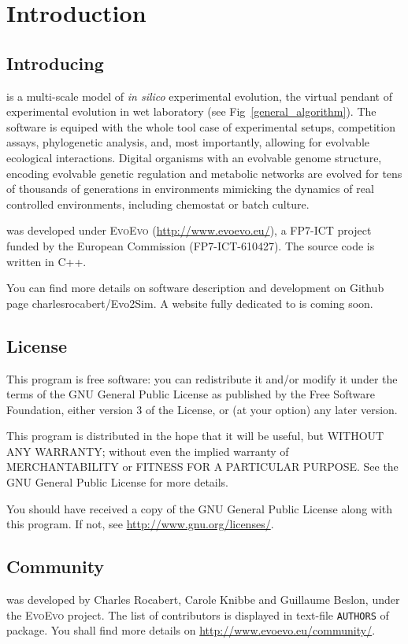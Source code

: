 \chapter{Introduction}

\section{Introducing \packageName}

{\packageName} is a multi-scale model of \textit{in silico} experimental evolution, the virtual pendant of experimental evolution in wet laboratory (see Fig~\ref{general_algorithm}).
The software is equiped with the whole tool case of experimental setups, competition assays, phylogenetic analysis, and, most importantly, allowing for evolvable ecological interactions. Digital organisms with an evolvable genome structure, encoding evolvable genetic regulation and metabolic networks are evolved for tens of thousands of generations in environments mimicking the dynamics of real controlled environments, including chemostat or batch culture.

{\packageName} was developed under \textsc{EvoEvo} (\href{http://www.evoevo.eu/}{http://www.evoevo.eu/}), a FP7-ICT project funded by the European Commission (FP7-ICT-610427). The source code is written in C++.

You can find more details on software description and development on Github page charlesrocabert/Evo2Sim. A website fully dedicated to {\packageName} is coming soon.

\section{License}

This program is free software: you can redistribute it and/or modify it under the terms of the GNU General Public License as published by the Free Software Foundation, either version 3 of the License, or (at your option) any later version.

This program is distributed in the hope that it will be useful, but WITHOUT ANY WARRANTY; without even the implied warranty of MERCHANTABILITY or FITNESS FOR A PARTICULAR PURPOSE. See the GNU General Public License for more details.

You should have received a copy of the GNU General Public License along with this program. If not, see \href{http://www.gnu.org/licenses/}{http://www.gnu.org/licenses/}.

\section{Community}
{\packageName} was developed by Charles Rocabert, Carole Knibbe and Guillaume Beslon, under the \textsc{EvoEvo} project. The list of contributors is displayed in text-file \texttt{AUTHORS} of {\packageName}  package.
You shall find more details on \href{http://www.evoevo.eu/community/}{http://www.evoevo.eu/community/}.

